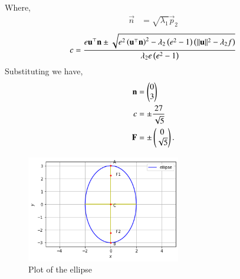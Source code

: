 \documentclass[journal,12pt,twocolumn]{IEEEtran}
\begin{document}
Where,
\begin{align}
    \vec{n} &= \sqrt{\lambda_1}\vec{p}_2
\end{align}
\begin{multline}
     c = \frac{e\mathbf{u}^{\top}\mathbf{n} \pm \sqrt{e^2\left(\mathbf{u}^{\top}\mathbf{n}\right)^2-\lambda_2\left(e^2-1\right)\left(\lVert\mathbf{u}\rVert^2 - \lambda_2 f\right)}}{\lambda_2e\left(e^2-1\right)} 
\end{multline}
Substituting we have,
\begin{align}
    \mathbf{n} &= \begin{pmatrix}0\\3\end{pmatrix}\\ c &= \pm\frac{27}{\sqrt{5}}\\
    \mathbf{F} &= \pm\begin{pmatrix}0 \\ \sqrt{5}\end{pmatrix}.
\end{align}
\begin{figure}[t!]
  \centering
  \includegraphics[keepaspectratio, width=0.6\textwidth]{ellipse.png}
  \caption{Plot of the ellipse}   
  \label{fig:RSUencountered} 
\end{figure}
\end{document}

